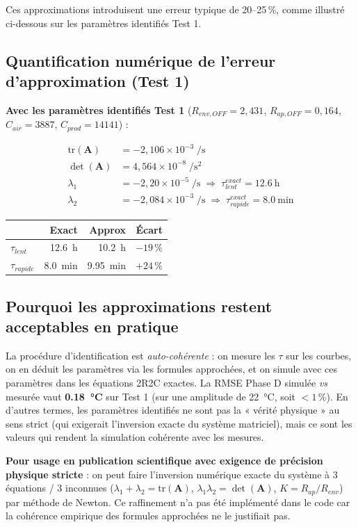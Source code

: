 \documentclass[11pt,a4paper]{article}
\begin{document}
Ces approximations introduisent une erreur typique de 20--25\,\%, comme illustré ci-dessous
sur les paramètres identifiés Test 1.

\subsection{Quantification numérique de l'erreur d'approximation (Test 1)}

\begin{exemple}
\textbf{Avec les paramètres identifiés Test 1} ($R_{env,OFF}=2{,}431$, $R_{ap,OFF}=0{,}164$,
$C_{air}=3887$, $C_{prod}=14141$) :

\begin{align*}
\mathrm{tr}(\mathbf{A}) &= -2{,}106\times 10^{-3}\;\si{\per\second}\\
\det(\mathbf{A}) &= 4{,}564\times 10^{-8}\;\si{\per\second\squared}\\
\lambda_1 &= -2{,}20\times 10^{-5}\;\si{\per\second} \;\Rightarrow\; \tau_{lent}^{exact} = \SI{12,6}{\hour}\\
\lambda_2 &= -2{,}084\times 10^{-3}\;\si{\per\second} \;\Rightarrow\; \tau_{rapide}^{exact} = \SI{8,0}{\minute}
\end{align*}

\begin{center}
\begin{tabular}{lrrr}
\toprule
& \textbf{Exact} & \textbf{Approx} & \textbf{Écart} \\
\midrule
$\tau_{lent}$ & \SI{12,6}{\hour} & \SI{10,2}{\hour} & $-19\,\%$ \\
$\tau_{rapide}$ & \SI{8,0}{\minute} & \SI{9,95}{\minute} & $+24\,\%$ \\
\bottomrule
\end{tabular}
\end{center}
\end{exemple}

\subsection{Pourquoi les approximations restent acceptables en pratique}

La procédure d'identification est \emph{auto-cohérente} : on mesure les $\tau$ sur les
courbes, on en déduit les paramètres via les formules approchées, et on simule avec ces
paramètres dans les équations 2R2C exactes. La RMSE Phase D simulée \emph{vs} mesurée vaut
\textbf{\SI{0,18}{\celsius}} sur Test 1 (sur une amplitude de \SI{22}{\celsius}, soit
$<1\,\%$). En d'autres termes, les paramètres identifiés ne sont pas la « vérité physique »
au sens strict (qui exigerait l'inversion exacte du système matriciel), mais ce sont les
valeurs qui rendent la simulation cohérente avec les mesures.

\textbf{Pour usage en publication scientifique avec exigence de précision physique stricte}
: on peut faire l'inversion numérique exacte du système à 3 équations / 3 inconnues
($\lambda_1+\lambda_2 = \mathrm{tr}(\mathbf{A})$, $\lambda_1\lambda_2 = \det(\mathbf{A})$,
$K = R_{ap}/R_{env}$) par méthode de Newton. Ce raffinement n'a pas été implémenté dans le
code car la cohérence empirique des formules approchées ne le justifiait pas.
\end{document}
